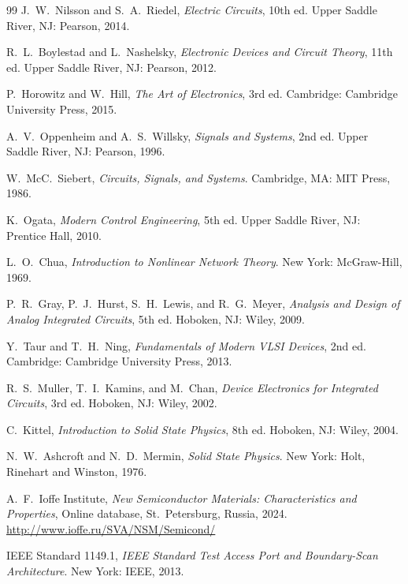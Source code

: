 ﻿\documentclass[12pt, a4paper]{article}
\begin{document}
\begin{thebibliography}{99}
		J.~W.~Nilsson and S.~A.~Riedel,
		\textit{Electric Circuits}, 10th ed.
		Upper Saddle River, NJ: Pearson, 2014.
		
		R.~L.~Boylestad and L.~Nashelsky,
		\textit{Electronic Devices and Circuit Theory}, 11th ed.
		Upper Saddle River, NJ: Pearson, 2012.
		
		P.~Horowitz and W.~Hill,
		\textit{The Art of Electronics}, 3rd ed.
		Cambridge: Cambridge University Press, 2015.
		
		A.~V.~Oppenheim and A.~S.~Willsky,
		\textit{Signals and Systems}, 2nd ed.
		Upper Saddle River, NJ: Pearson, 1996.
		
		W.~McC.~Siebert,
		\textit{Circuits, Signals, and Systems}.
		Cambridge, MA: MIT Press, 1986.
		
		K.~Ogata,
		\textit{Modern Control Engineering}, 5th ed.
		Upper Saddle River, NJ: Prentice Hall, 2010.
		
		L.~O.~Chua,
		\textit{Introduction to Nonlinear Network Theory}.
		New York: McGraw-Hill, 1969.
		
		P.~R.~Gray, P.~J.~Hurst, S.~H.~Lewis, and R.~G.~Meyer,
		\textit{Analysis and Design of Analog Integrated Circuits}, 5th ed.
		Hoboken, NJ: Wiley, 2009.
		
		Y.~Taur and T.~H.~Ning,
		\textit{Fundamentals of Modern VLSI Devices}, 2nd ed.
		Cambridge: Cambridge University Press, 2013.
		
		R.~S.~Muller, T.~I.~Kamins, and M.~Chan,
		\textit{Device Electronics for Integrated Circuits}, 3rd ed.
		Hoboken, NJ: Wiley, 2002.
		
		C.~Kittel,
		\textit{Introduction to Solid State Physics}, 8th ed.
		Hoboken, NJ: Wiley, 2004.
		
		N.~W.~Ashcroft and N.~D.~Mermin,
		\textit{Solid State Physics}.
		New York: Holt, Rinehart and Winston, 1976.
		
		A.~F.~Ioffe Institute,
		\textit{New Semiconductor Materials: Characteristics and Properties},
		Online database, St.~Petersburg, Russia, 2024.
		\url{http://www.ioffe.ru/SVA/NSM/Semicond/}
		
		IEEE Standard 1149.1,
		\textit{IEEE Standard Test Access Port and Boundary-Scan Architecture}.
		New York: IEEE, 2013.
		

\end{thebibliography}
\end{document}
